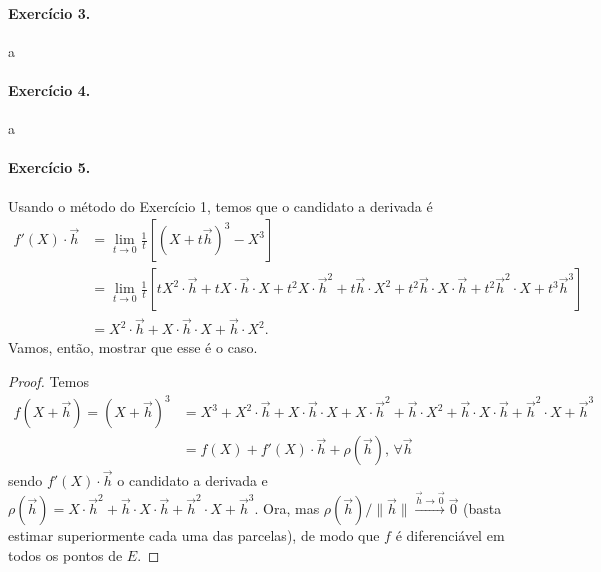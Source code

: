 \documentclass[12pt,a4paper]{article}
\begin{document}
\paragraph{Exercício 3.}
    a
%
\paragraph{Exercício 4.}
    a
%
\paragraph{Exercício 5.}
    Usando o método do Exercício 1, temos que o candidato a derivada é
    \begin{align*}
        f'(X)\cdot\vec{h} &= \lim_{t\to 0}\frac{1}{t}\left[ (X+t\vec{h})^3 - X^3 \right] \\
                          &= \lim_{t\to 0}\frac{1}{t}\left[ tX^2\cdot\vec{h} + tX\cdot\vec{h}\cdot X
                          + t^2X\cdot\vec{h}^2 + t\vec{h}\cdot X^2 + t^2\vec{h}\cdot X\cdot\vec{h}
                          + t^2\vec{h}^2\cdot X + t^3\vec{h}^3 \right] \\
                          &= X^2\cdot\vec{h} + X\cdot\vec{h}\cdot X + \vec{h}\cdot X^2.
    \end{align*}    
    Vamos, então, mostrar que esse é o caso.
    \begin{proof}
        Temos
        \begin{align*}
            f(X+\vec{h}) = (X+\vec{h})^3 &= X^3 + X^2\cdot\vec{h} + X\cdot\vec{h}\cdot X
                                         + X\cdot\vec{h}^2 + \vec{h}\cdot X^2 + \vec{h}\cdot X\cdot\vec{h}
                                         + \vec{h}^2\cdot X + \vec{h}^3 \\
                                         &= f(X) + f'(X)\cdot\vec{h} + \rho(\vec{h}), \, \forall\vec{h}
        \end{align*}
        sendo $f'(X)\cdot\vec{h}$ o candidato a derivada e $\rho(\vec{h}) = X\cdot\vec{h}^2 + 
        \vec{h}\cdot X\cdot\vec{h} + \vec{h}^2\cdot X + \vec{h}^3$. Ora, mas 
        $\rho(\vec{h})/\|\vec{h}\| \xrightarrow{\vec{h}\to\vec{0}} \vec{0}$ (basta estimar superiormente
        cada uma das parcelas), de modo que $f$ é diferenciável em todos os pontos de $E$.
    \end{proof}
%
\end{document}
